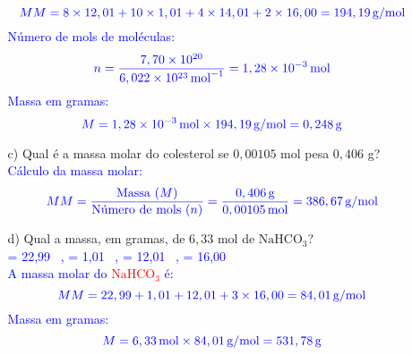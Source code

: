 \documentclass[a4paper, 12pt]{article}
\begin{document}
\begin{enumerate}
\begin{enumerate}[align=left, labelsep=-0.5em]
                    \[
                        \textcolor{blue}{\text{$MM$} = 8 \times 12,01 + 10 \times 1,01 + 4 \times 14,01 + 2 \times 16,00 = 194,19 \, \text{g/mol}}
                    \]
                    \textcolor{blue}{Número de mols de moléculas:}
                    \[
                        \textcolor{blue}{\text{$n$} = \frac{7,70 \times 10^{20}}{6,022 \times 10^{23} \, \text{mol}^{-1}} = 1,28 \times 10^{-3} \, \text{mol}}
                    \]
                    \textcolor{blue}{Massa em gramas:}
                    \[
                        \textcolor{blue}{\text{$M$} = 1,28 \times 10^{-3} \, \text{mol} \times 194,19 \, \text{g/mol} = 0,248 \, \text{g}}
                    \]
              \item[c)] Qual é a massa molar do colesterol se \(0,00105\) mol pesa \(0,406\) g?
                    \\[10pt]
                    \textcolor{blue}{Cálculo da massa molar:}
                    \[
                        \textcolor{blue}{\text{\text{$MM$}} = \frac{\text{Massa (\text{$M$})}}{\text{Número de mols (\text{$n$})}} = \frac{0,406 \, \text{g}}{0,00105 \, \text{mol}} = 386,67 \, \text{g/mol}}
                    \]
              \item[d)] Qual a massa, em gramas, de \(6,33\) mol de \(\text{NaHCO}_{3}\)?
                    \\[10pt]
                    \textcolor{blue}{\textcolor{red}{} = 22,99 \, , \quad \textcolor{red}{} = 1,01 \, , \quad \textcolor{red}{} = 12,01 \, , \quad \textcolor{red}{} = 16,00 \, }
                    \\[10pt]
                    \textcolor{blue}{A massa molar do \textcolor{red}{\(\text{NaHCO}_{3}\)} é:}
                    \[
                        \textcolor{blue}{\text{$MM$} = 22,99 + 1,01 + 12,01 + 3 \times 16,00 = 84,01 \, \text{g/mol}}
                    \]
                    \textcolor{blue}{Massa em gramas:}
                    \[
                        \textcolor{blue}{\text{$M$} = 6,33 \, \text{mol} \times 84,01 \, \text{g/mol} = 531,78 \, \text{g}}
                    \]


\end{enumerate}
\end{enumerate}
\end{document}
